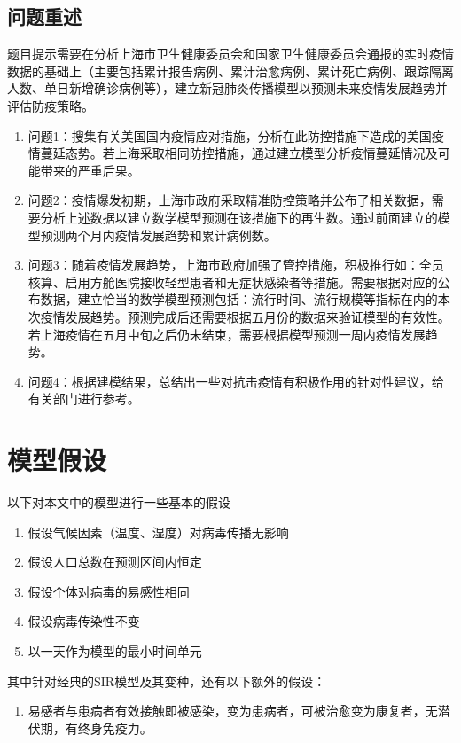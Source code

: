 \documentclass[bwprint]{gmcmthesis}
\numberwithin{figure}{section}
\begin{document}
\subsection{问题重述}
题目提示需要在分析上海市卫生健康委员会和国家卫生健康委员会通报的实时疫情数据的基础上（主要包括累计报告病例、累计治愈病例、累计死亡病例、跟踪隔离人数、单日新增确诊病例等），建立新冠肺炎传播模型以预测未来疫情发展趋势并评估防疫策略。
\begin{enumerate}
\item
问题1：搜集有关美国国内疫情应对措施，分析在此防控措施下造成的美国疫情蔓延态势。若上海采取相同防控措施，通过建立模型分析疫情蔓延情况及可能带来的严重后果。
\item 问题2：疫情爆发初期，上海市政府采取精准防控策略并公布了相关数据，需要分析上述数据以建立数学模型预测在该措施下的再生数。通过前面建立的模型预测两个月内疫情发展趋势和累计病例数。
\item 问题3：随着疫情发展趋势，上海市政府加强了管控措施，积极推行如：全员核算、启用方舱医院接收轻型患者和无症状感染者等措施。需要根据对应的公布数据，建立恰当的数学模型预测包括：流行时间、流行规模等指标在内的本次疫情发展趋势。预测完成后还需要根据五月份的数据来验证模型的有效性。若上海疫情在五月中旬之后仍未结束，需要根据模型预测一周内疫情发展趋势。
\item 问题4：根据建模结果，总结出一些对抗击疫情有积极作用的针对性建议，给有关部门进行参考。
\end{enumerate}



\section{模型假设}
\par 以下对本文中的模型进行一些基本的假设
\begin{enumerate}
\item 假设气候因素（温度、湿度）对病毒传播无影响
\item 假设人口总数在预测区间内恒定
\item 假设个体对病毒的易感性相同
\item 假设病毒传染性不变
\item 以一天作为模型的最小时间单元
\end{enumerate}




\par 其中针对经典的SIR模型及其变种，还有以下额外的假设：
\begin{enumerate}
    \item 易感者与患病者有效接触即被感染，变为患病者，可被治愈变为康复者，无潜伏期，有终身免疫力。
\end{enumerate}
    
\end{document}
